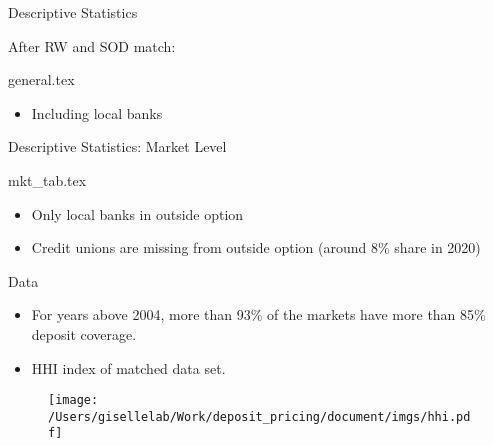 \documentclass[notes,11pt, aspectratio=169]{beamer}
\begin{document}
\begin{frame}{Descriptive Statistics}

  After RW and SOD match:
  \begin{table}[h]
  {general.tex}
  \end{table}

  \begin{itemize}
    \item Including local banks
  \end{itemize}
\end{frame}


\begin{frame}{Descriptive Statistics: Market Level}


  \begin{table}[h]
  {mkt_tab.tex}
  \end{table}

  \begin{itemize}
    \item Only local banks in outside option
    \item Credit unions are missing from outside option (around 8\% share in 2020)
  \end{itemize}
\end{frame}



\begin{frame}{Data}

  \begin{itemize}
    \item For years above 2004, more than 93\% of the markets have more than 85\% deposit coverage. 
    \item HHI index of matched data set. 
  \end{itemize}
  
    \begin{figure}[t*]
      \centering
    
      \texttt{[image: /Users/gisellelab/Work/deposit\_pricing/document/imgs/hhi.pdf]}
    \end{figure}
    
  \end{frame}
\end{document}
